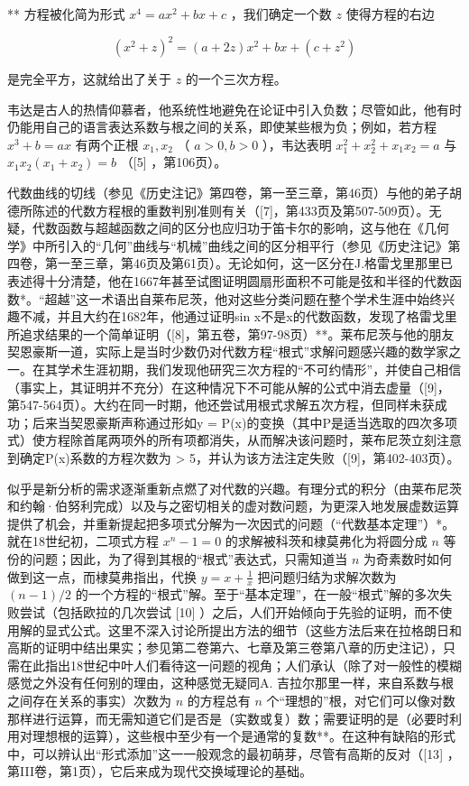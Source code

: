 ** 方程被化简为形式 \(x^4 = ax^2 + bx + c\) ，我们确定一个数 \(z\) 使得方程的右边

\[
(x ^ {2} + z) ^ {2} = (a + 2 z) x ^ {2} + b x + (c + z ^ {2})
\]

是完全平方，这就给出了关于 \(z\) 的一个三次方程。

韦达是古人的热情仰慕者，他系统性地避免在论证中引入负数；尽管如此，他有时仍能用自己的语言表达系数与根之间的关系，即使某些根为负；例如，若方程 \(x^3 + b = ax\) 有两个正根 \(x_1, x_2\) （ \(a > 0, b > 0\) ），韦达表明 \(x_1^2 + x_2^2 + x_1x_2 = a\) 与 \(x_1x_2(x_1 + x_2) = b\) （{[}5{]} ，第106页）。

代数曲线的切线（参见《历史注记》第四卷，第一至三章，第46页）与他的弟子胡德所陈述的代数方程根的重数判别准则有关（{[}7{]}，第433页及第507-509页）。无疑，代数函数与超越函数之间的区分也应归功于笛卡尔的影响，这与他在《几何学》中所引入的“几何”曲线与“机械”曲线之间的区分相平行（参见《历史注记》第四卷，第一至三章，第46页及第61页）。无论如何，这一区分在J.格雷戈里那里已表述得十分清楚，他在1667年甚至试图证明圆扇形面积不可能是弦和半径的代数函数*。“超越”这一术语出自莱布尼茨，他对这些分类问题在整个学术生涯中始终兴趣不减，并且大约在1682年，他通过证明sin x不是x的代数函数，发现了格雷戈里所追求结果的一个简单证明（{[}8{]}，第五卷，第97-98页）**。莱布尼茨与他的朋友契恩豪斯一道，实际上是当时少数仍对代数方程“根式”求解问题感兴趣的数学家之一。在其学术生涯初期，我们发现他研究三次方程的“不可约情形”，并使自己相信（事实上，其证明并不充分）在这种情况下不可能从解的公式中消去虚量（{[}9{]}，第547-564页）。大约在同一时期，他还尝试用根式求解五次方程，但同样未获成功；后来当契恩豪斯声称通过形如y = P(x)的变换（其中P是适当选取的四次多项式）使方程除首尾两项外的所有项都消失，从而解决该问题时，莱布尼茨立刻注意到确定P(x)系数的方程次数为 \textgreater{} 5，并认为该方法注定失败（{[}9{]}，第402-403页）。

似乎是新分析的需求逐渐重新点燃了对代数的兴趣。有理分式的积分（由莱布尼茨和约翰·伯努利完成）以及与之密切相关的虚对数问题，为更深入地发展虚数运算提供了机会，并重新提起把多项式分解为一次因式的问题（“代数基本定理”）*。就在18世纪初，二项式方程 \(x^n - 1 = 0\) 的求解被科茨和棣莫弗化为将圆分成 \(n\) 等份的问题；因此，为了得到其根的“根式”表达式，只需知道当 \(n\) 为奇素数时如何做到这一点，而棣莫弗指出，代换 \(y = x + \frac{1}{x}\) 把问题归结为求解次数为 \((n - 1)/2\) 的一个方程的“根式”解。至于“基本定理”，在一般“根式”解的多次失败尝试（包括欧拉的几次尝试 {[}10{]} ）之后，人们开始倾向于先验的证明，而不使用解的显式公式。这里不深入讨论所提出方法的细节（这些方法后来在拉格朗日和高斯的证明中结出果实；参见第二卷第六、七章及第三卷第八章的历史注记），只需在此指出18世纪中叶人们看待这一问题的视角；人们承认（除了对一般性的模糊感觉之外没有任何别的理由，这种感觉无疑同A. 吉拉尔那里一样，来自系数与根之间存在关系的事实）次数为 \(n\) 的方程总有 \(n\) 个“理想的”根，对它们可以像对数那样进行运算，而无需知道它们是否是（实数或复）数；需要证明的是（必要时利用对理想根的运算），这些根中至少有一个是通常的复数**。在这种有缺陷的形式中，可以辨认出“形式添加”这一一般观念的最初萌芽，尽管有高斯的反对（{[}13{]} ，第III卷，第1页），它后来成为现代交换域理论的基础。

